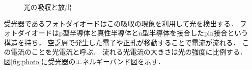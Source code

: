 \begin{figure}[t!]
\begin{center}
\caption{光の吸収と放出}
\label{fig:kyusyuhosya}
\end{center}
\end{figure}
受光器であるフォトダイオードはこの吸収の現象を利用して光を検出する．
フォトダイオードはp型半導体と真性半導体とn型半導体を接合したpin接合という構造を持ち，
空乏層で発生した電子や正孔が移動することで電流が流れる．
この電流のことを光電流と呼ぶ．
流れる光電流の大きさは光の強度に比例する．
図\ref{fig:photo}に受光器のエネルギーバンド図を示す．
